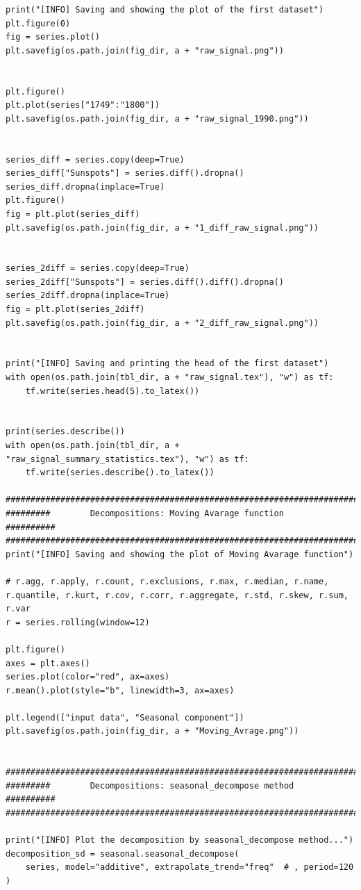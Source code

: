 \documentclass[12pt]{article}
\begin{document}
\begin{lstlisting}
print("[INFO] Saving and showing the plot of the first dataset")
plt.figure(0)
fig = series.plot()
plt.savefig(os.path.join(fig_dir, a + "raw_signal.png"))


plt.figure()
plt.plot(series["1749":"1800"])
plt.savefig(os.path.join(fig_dir, a + "raw_signal_1990.png"))


series_diff = series.copy(deep=True)
series_diff["Sunspots"] = series.diff().dropna()
series_diff.dropna(inplace=True)
plt.figure()
fig = plt.plot(series_diff)
plt.savefig(os.path.join(fig_dir, a + "1_diff_raw_signal.png"))


series_2diff = series.copy(deep=True)
series_2diff["Sunspots"] = series.diff().diff().dropna()
series_2diff.dropna(inplace=True)
fig = plt.plot(series_2diff)
plt.savefig(os.path.join(fig_dir, a + "2_diff_raw_signal.png"))


print("[INFO] Saving and printing the head of the first dataset")
with open(os.path.join(tbl_dir, a + "raw_signal.tex"), "w") as tf:
    tf.write(series.head(5).to_latex())


print(series.describe())
with open(os.path.join(tbl_dir, a + "raw_signal_summary_statistics.tex"), "w") as tf:
    tf.write(series.describe().to_latex())

############################################################################
#########        Decompositions: Moving Avarage function          ##########
############################################################################
print("[INFO] Saving and showing the plot of Moving Avarage function")

# r.agg, r.apply, r.count, r.exclusions, r.max, r.median, r.name, r.quantile, r.kurt, r.cov, r.corr, r.aggregate, r.std, r.skew, r.sum, r.var
r = series.rolling(window=12)

plt.figure()
axes = plt.axes()
series.plot(color="red", ax=axes)
r.mean().plot(style="b", linewidth=3, ax=axes)

plt.legend(["input data", "Seasonal component"])
plt.savefig(os.path.join(fig_dir, a + "Moving_Avrage.png"))


############################################################################
#########        Decompositions: seasonal_decompose method        ##########
############################################################################

print("[INFO] Plot the decomposition by seasonal_decompose method...")
decomposition_sd = seasonal.seasonal_decompose(
    series, model="additive", extrapolate_trend="freq"  # , period=120
)


\end{lstlisting}
\end{document}
